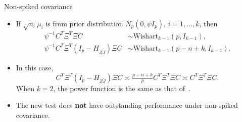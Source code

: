 \documentclass{beamer}
\DeclareMathOperator{\mytr}{tr}
\theoremstyle{plain}
\theoremstyle{definition}
\theoremstyle{remark}
\begin{document}
\begin{frame}{Non-spiked covariance}
    \begin{itemize}
        \item
            If $\sqrt{n_i}\mu_i$ is from prior distribution $N_p(0,\psi I_p)$, $i=1,\ldots,k$, then
            $$
            \begin{aligned}
                \psi^{-1}  C^T \Xi^T\Xi C&\sim  \text{Wishart}_{k-1}(p,I_{k-1}),\\
                \psi^{-1}  C^T \Xi^T (I_p-H_{Z\tilde{J}})\Xi C&\sim  \text{Wishart}_{k-1}(p-n+k,I_{k-1}).
            \end{aligned}
            $$
        \item
            In this case, 
            $$ C^T \Xi^T (I_p-H_{Z\tilde{J}})\Xi C\asymp\tfrac{p-n+k}{p}C^T \Xi^T\Xi C\asymp C^T \Xi^T\Xi C.$$
             When $k=2$, the power function is the same as that of~\cite{Chen2010A}.
        \item
            The new test does \textbf{not} have outstanding performance under non-spiked covariance.

    \end{itemize}
\end{frame}
\end{document}
